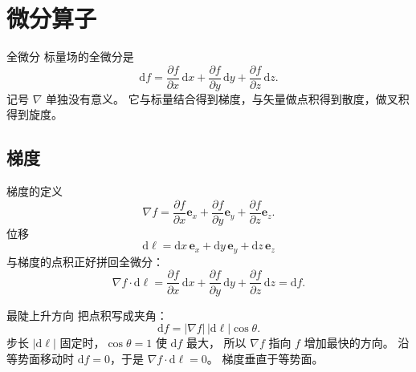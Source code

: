 \documentclass[fontset=windows, chinese, 10pt, xcolor=dvipsnames]{beamer}
\begin{document}
\section{微分算子}

\begin{frame}{全微分}
  标量场的全微分是
  \begin{equation*}
    \mathrm{d}f
    = \frac{\partial f}{\partial x}\,\mathrm{d}x
    + \frac{\partial f}{\partial y}\,\mathrm{d}y
    + \frac{\partial f}{\partial z}\,\mathrm{d}z.
  \end{equation*}
  记号 $\nabla$ 单独没有意义。
  它与标量结合得到梯度，与矢量做点积得到散度，做叉积得到旋度。
\end{frame}

\subsection{梯度}

\begin{frame}{梯度的定义}
  \begin{equation*}
    \nabla f
    = \frac{\partial f}{\partial x}\mathbf{e}_x
    + \frac{\partial f}{\partial y}\mathbf{e}_y
    + \frac{\partial f}{\partial z}\mathbf{e}_z.
  \end{equation*}
  位移
  \begin{equation*}
    \mathrm{d}\boldsymbol{\ell}
    = \mathrm{d}x\,\mathbf{e}_x
    + \mathrm{d}y\,\mathbf{e}_y
    + \mathrm{d}z\,\mathbf{e}_z
  \end{equation*}
  与梯度的点积正好拼回全微分：
  \begin{equation*}
    \nabla f\cdot\mathrm{d}\boldsymbol{\ell}
    = \frac{\partial f}{\partial x}\,\mathrm{d}x
    + \frac{\partial f}{\partial y}\,\mathrm{d}y
    + \frac{\partial f}{\partial z}\,\mathrm{d}z
    = \mathrm{d}f.
  \end{equation*}
\end{frame}

\begin{frame}{最陡上升方向}
  把点积写成夹角：
  \begin{equation*}
    \mathrm{d}f
    = |\nabla f|\,|\mathrm{d}\boldsymbol{\ell}|\cos\theta.
  \end{equation*}
  步长 $|\mathrm{d}\boldsymbol{\ell}|$ 固定时，$\cos\theta=1$ 使 $\mathrm{d}f$ 最大，
  所以 $\nabla f$ 指向 $f$ 增加最快的方向。
  \vspace{0.4em}
  沿等势面移动时 $\mathrm{d}f=0$，于是
  $\nabla f\cdot\mathrm{d}\boldsymbol{\ell}=0$。
  梯度垂直于等势面。
\end{frame}
\end{document}

